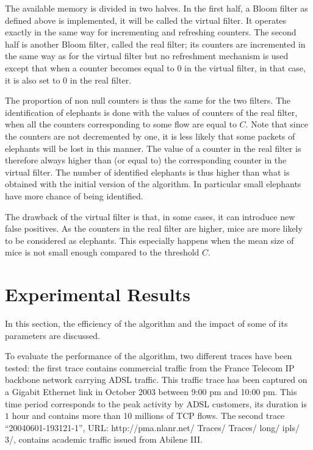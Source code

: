 \documentclass{amsart}
\begin{document}
The available  memory is  divided in two  halves.  In  the first half,  a Bloom  filter as
defined above   is implemented, it will be  called the virtual filter. It  operates exactly in
the same  way for  incrementing and refreshing  counters.  The second half  is another
Bloom filter, called the real filter;  its  counters are incremented in the same way as for
the virtual filter but no refreshment mechanism is used except that when a counter becomes
equal  to $0$  in the  virtual filter, in that case,  it is  also set
to $0$ in the real filter. 

The proportion of  non null counters is  thus the same for  the two filters. The  identification of
elephants is done  with the values of counters  of the real filter, when  all the counters
corresponding  to some  flow  are equal  to  $C$. Note  that since  the  counters are  not
decremented by one, it is less likely that  some packets of elephants will be lost in this
manner. The  value of a  counter in the  real filter is  therefore always higher  than (or
equal  to) the  corresponding counter  in  the virtual  filter. The  number of  identified
elephants is thus higher than what is obtained with the initial version of the algorithm. In
particular small elephants have more chance of being identified.

The drawback of the virtual filter is that, in some cases, it can introduce new false
positives. As the counters in the real filter are  higher, mice are more
likely to be considered as elephants. This especially happens when the
mean  size of mice
is not small enough compared to the threshold $C$.  



\section{Experimental Results}\label{secexpe}
In this section, the efficiency of the  algorithm and the impact of some of its parameters
are   discussed.  

To evaluate the  performance of the algorithm, two different traces  have been tested: the
first  trace contains  commercial  traffic from  the  France Telecom  IP backbone  network
carrying ADSL traffic. This traffic trace has  been captured on a Gigabit Ethernet link in
October 2003 between 9:00 pm and 10:00 pm. This time period corresponds to the peak activity by
ADSL customers, its duration is $1$ hour  and contains more than 10 millions of TCP flows.
The             second            trace             ``20040601-193121-1'',            URL:
http://pma.nlanr.net/ Traces/ Traces/ long/ ipls/ 3/,  contains  academic  traffic issued  from
Abilene III.
\end{document}

